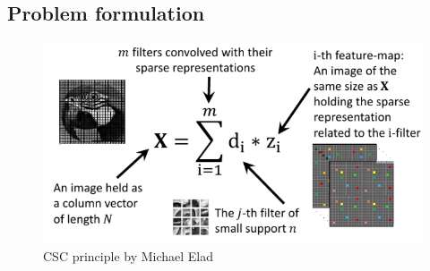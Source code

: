 \subsection*{Problem formulation}
\begin{figure}[h]
 \centering
 \includegraphics[scale=0.7]{CSC_superslide.png}
 \caption{CSC principle by Michael Elad \protect\footnotemark}
 \label{fig:CSC_slide}
\end{figure}

